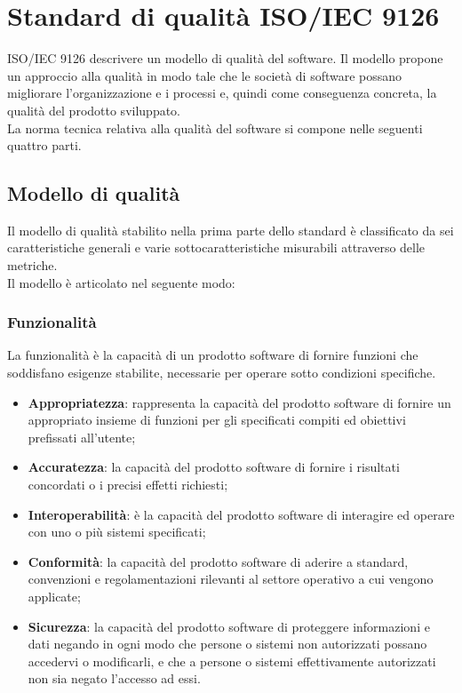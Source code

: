 \section{Standard di qualità ISO/IEC 9126}
ISO/IEC 9126 descrivere un modello di qualità del software. Il modello propone un approccio alla qualità in modo tale che le società di software possano migliorare l'organizzazione e i processi e, quindi come conseguenza concreta, la qualità del prodotto sviluppato. \\
La norma tecnica relativa alla qualità del software si compone nelle seguenti quattro parti.

\subsection{Modello di qualità}
Il modello di qualità stabilito nella prima parte dello standard è classificato da sei caratteristiche generali  e varie sottocaratteristiche misurabili attraverso delle metriche. \\
Il modello è articolato nel seguente modo:

\subsubsection{Funzionalità}
La funzionalità è la capacità di un prodotto software di fornire funzioni che soddisfano esigenze stabilite, necessarie per operare sotto condizioni specifiche.

\begin{itemize}

	\item \textbf{Appropriatezza}: rappresenta la capacità del prodotto software di fornire un appropriato insieme di funzioni per gli specificati compiti ed obiettivi prefissati all'utente;
	
    \item \textbf{Accuratezza}: la capacità del prodotto software di fornire i risultati concordati o i precisi effetti richiesti;
    
    \item \textbf{Interoperabilità}: è la capacità del prodotto software di interagire ed operare con uno o più sistemi specificati;
    
    \item \textbf{Conformità}: la capacità del prodotto software di aderire a standard, convenzioni e regolamentazioni rilevanti al settore operativo a cui vengono applicate;
    
    \item \textbf{Sicurezza}: la capacità del prodotto software di proteggere informazioni e dati negando in ogni modo che persone o sistemi non autorizzati possano accedervi o modificarli, e che a persone o sistemi effettivamente autorizzati non sia negato l'accesso ad essi.
    
\end{itemize}

